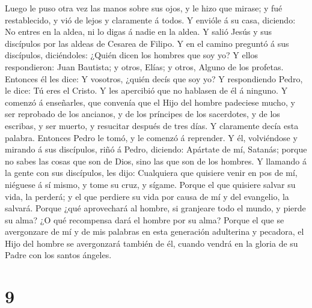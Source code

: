 Luego le puso otra vez las manos sobre sus ojos, y le hizo que mirase; y
fué restablecido, y vió de lejos y claramente á todos.  Y
envióle á su casa, diciendo: No entres en la aldea, ni lo digas á nadie
en la aldea.  Y salió Jesús y sus discípulos por las aldeas
de Cesarea de Filipo. Y en el camino preguntó á sus discípulos,
diciéndoles: ¿Quién dicen los hombres que soy yo?  Y ellos
respondieron: Juan Bautista; y otros, Elías; y otros, Alguno de los
profetas.  Entonces él les dice: Y vosotros, ¿quién decís
que soy yo? Y respondiendo Pedro, le dice: Tú eres el Cristo.
 Y les apercibió que no hablasen de él á ninguno.
 Y comenzó á enseñarles, que convenía que el Hijo del
hombre padeciese mucho, y ser reprobado de los ancianos, y de los
príncipes de los sacerdotes, y de los escribas, y ser muerto, y
resucitar después de tres días.  Y claramente decía esta
palabra. Entonces Pedro le tomó, y le comenzó á reprender. 
Y él, volviéndose y mirando á sus discípulos, riñó á Pedro, diciendo:
Apártate de mí, Satanás; porque no sabes las cosas que son de Dios, sino
las que son de los hombres.  Y llamando á la gente con sus
discípulos, les dijo: Cualquiera que quisiere venir en pos de mí,
niéguese á sí mismo, y tome su cruz, y sígame.  Porque el
que quisiere salvar su vida, la perderá; y el que perdiere su vida por
causa de mí y del evangelio, la salvará.  Porque ¿qué
aprovechará al hombre, si granjeare todo el mundo, y pierde su alma?
 ¿O qué recompensa dará el hombre por su alma?
 Porque el que se avergonzare de mí y de mis palabras en
esta generación adulterina y pecadora, el Hijo del hombre se avergonzará
también de él, cuando vendrá en la gloria de su Padre con los santos
ángeles.

\hypertarget{section-8}{%
\section{9}\label{section-8}}

